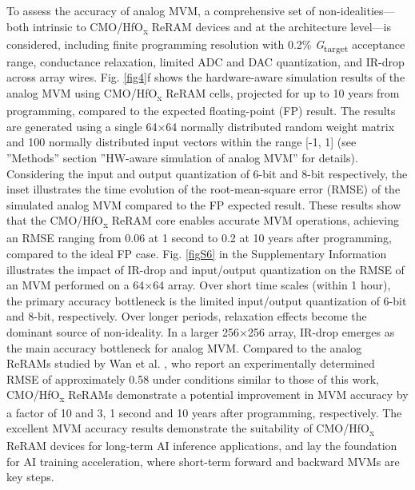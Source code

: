 To assess the accuracy of analog MVM, a comprehensive set of non-idealities—both intrinsic to CMO/HfO\textsubscript{\textnormal{x}} ReRAM devices and at the architecture level—is considered, including finite programming resolution with 0.2\% \textit{G}\textsubscript{\textnormal{target}} acceptance range, conductance relaxation, limited ADC and DAC quantization, and IR-drop across array wires. Fig. \ref{fig4}f shows the hardware-aware simulation results of the analog MVM using CMO/HfO\textsubscript{\textnormal{x}} ReRAM cells, projected for up to 10 years from programming, compared to the expected floating-point (FP) result. The results are generated using a single 64×64 normally distributed random weight matrix and 100 normally distributed input vectors within the range [-1, 1] (see ”Methods” section ”HW-aware simulation of analog MVM” for details). Considering the input and output quantization of 6-bit and 8-bit respectively, the inset illustrates the time evolution of the root-mean-square error (RMSE) of the simulated analog MVM compared to the FP expected result. These results show that the CMO/HfO\textsubscript{\textnormal{x}} ReRAM core enables accurate MVM operations, achieving an RMSE ranging from 0.06 at 1 second to 0.2 at 10 years after programming, compared to the ideal FP case. Fig. \ref{figS6} in the Supplementary Information illustrates the impact of IR-drop and input/output quantization on the RMSE of an MVM performed on a 64×64 array. Over short time scales (within 1 hour), the primary accuracy bottleneck is the limited input/output quantization of 6-bit and 8-bit, respectively. Over longer periods, relaxation effects become the dominant source of non-ideality. In a larger 256×256 array, IR-drop emerges as the main accuracy bottleneck for analog MVM. Compared to the analog ReRAMs studied by Wan et al. \cite{Wan2022}, who report an experimentally determined RMSE of approximately 0.58 under conditions similar to those of this work, CMO/HfO\textsubscript{\textnormal{x}} ReRAMs demonstrate a potential improvement in MVM accuracy by a factor of 10 and 3, 1 second and 10 years after programming, respectively. The excellent MVM accuracy results demonstrate the suitability of CMO/HfO\textsubscript{\textnormal{x}} ReRAM devices for long-term AI inference applications, and lay the foundation for AI training acceleration, where short-term forward and backward MVMs are key steps.

